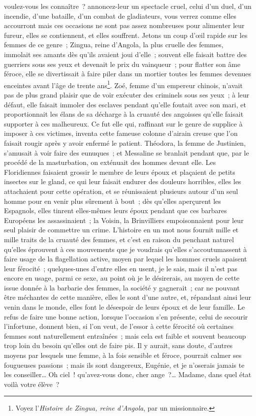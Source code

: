 \documentclass[french,twoside]{book} %
\begin{document}
voulez-vous les connaître ? annoncez-leur un spectacle cruel, celui d’un duel, d’un incendie, d’une bataille, d’un combat de gladiateurs, vous verrez comme elles accourront mais ces occasions ne sont pas assez nombreuses pour alimenter leur fureur, elles se contiennent, et elles souffrent. Jetons un coup d’œil rapide sur les femmes de ce genre ; Zingua, reine d’Angola, la plus cruelle des femmes, immolait ses amants dès qu’ils avaient joui d’elle ; souvent elle faisait battre des guerriers sous ses yeux et devenait le prix du vainqueur ; pour flatter son âme féroce, elle se divertissait à faire piler dans un mortier toutes les femmes devenues enceintes avant l’âge de trente ans\footnote{ Voyez l’{\itshape Histoire de Zingua, reine d’Angola}, par un missionnaire.}. Zoé, femme d’un empereur chinois, n’avait pas de plus grand plaisir que de voir exécuter des criminels sous ses yeux ; à leur défaut, elle faisait immoler des esclaves pendant qu’elle foutait avec son mari, et proportionnait les élans de sa décharge à la cruauté des angoisses qu’elle faisait supporter à ces malheureux. Ce fut elle qui, raffinant sur le genre de supplice à imposer à ces victimes, inventa cette fameuse colonne d’airain creuse que l’on faisait rougir après y avoir enfermé le patient. Théodora, la femme de Justinien, s’amusait à voir faire des eunuques ; et Messaline se branlait pendant que, par le procédé de la masturbation, on exténuait des hommes devant elle. Les Floridiennes faisaient grossir le membre de leurs époux et plaçaient de petits insectes sur le gland, ce qui leur faisait endurer des douleurs horribles, elles les attachaient pour cette opération, et se réunissaient plusieurs autour d’un seul homme pour en venir plus sûrement à bout ; dès qu’elles aperçurent les Espagnols, elles tinrent elles-mêmes leurs époux pendant que ces barbares Européens les assassinaient ; la Voisin, la Brinvilliers empoisonnaient pour leur seul plaisir de commettre un crime. L’histoire en un mot nous fournit mille et mille traits de la cruauté des femmes, et c’est en raison du penchant naturel qu’elles éprouvent à ces mouvements que je voudrais qu’elles s’accoutumassent à faire usage de la flagellation active, moyen par lequel les hommes cruels apaisent leur férocité ; quelques-unes d’entre elles en usent, je le sais, mais il n’est pas encore en usage, parmi ce sexe, au point où je le désirerais, au moyen de cette issue donnée à la barbarie des femmes, la société y gagnerait ; car ne pouvant être méchantes de cette manière, elles le sont d’une autre, et, répandant ainsi leur venin dans le monde, elles font le désespoir de leurs époux et de leur famille. Le refus de faire une bonne action, lorsque l’occasion s’en présente, celui de secourir l’infortune, donnent bien, si l’on veut, de l’essor à cette férocité où certaines femmes sont naturellement entraînées ; mais cela est faible et souvent beaucoup trop loin du besoin qu’elles ont de faire pis. Il y aurait, sans doute, d’autres moyens par lesquels une femme, à la fois sensible et féroce, pourrait calmer ses fougueuses passions ; mais ils sont dangereux, Eugénie, et je n’oserais jamais te les conseiller… Oh ciel ! qu’avez-vous donc, cher ange ?… Madame, dans quel état voilà votre élève ?\par
\end{document}
